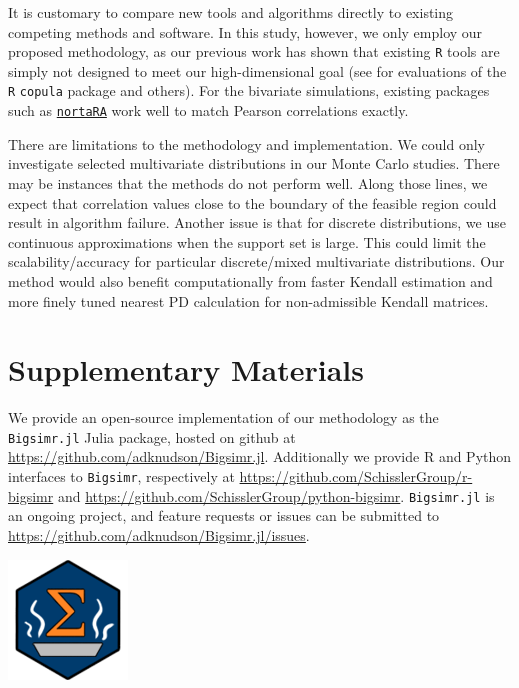 \documentclass[
]{jss}
\begin{document}
It is customary to compare new tools and algorithms directly to existing
competing methods and software. In this study, however, we only employ
our proposed methodology, as our previous work has shown that existing
\texttt{R} tools are simply not designed to meet our high-dimensional
goal (see \citet{Li2019gpu} for evaluations of the \texttt{R}
\texttt{copula} package and others). For the bivariate simulations,
existing packages such as
\href{https://github.com/superdesolator/NORTARA}{\texttt{nortaRA}} work
well to match Pearson correlations exactly.

There are limitations to the methodology and implementation. We could
only investigate selected multivariate distributions in our Monte Carlo
studies. There may be instances that the methods do not perform well.
Along those lines, we expect that correlation values close to the
boundary of the feasible region could result in algorithm failure.
Another issue is that for discrete distributions, we use continuous
approximations when the support set is large. This could limit the
scalability/accuracy for particular discrete/mixed multivariate
distributions. Our method would also benefit computationally from faster
Kendall estimation and more finely tuned nearest PD calculation for
non-admissible Kendall matrices.

\newpage

\hypertarget{misc}{%
\section*{Supplementary Materials}\label{misc}}

We provide an open-source implementation of our methodology as the
\texttt{Bigsimr.jl} Julia package, hosted on github at
\url{https://github.com/adknudson/Bigsimr.jl}. Additionally we provide R
and Python interfaces to \texttt{Bigsimr}, respectively at
\url{https://github.com/SchisslerGroup/r-bigsimr} and
\url{https://github.com/SchisslerGroup/python-bigsimr}.
\texttt{Bigsimr.jl} is an ongoing project, and feature requests or
issues can be submitted to
\url{https://github.com/adknudson/Bigsimr.jl/issues}.

\begin{CodeChunk}


\begin{center}\includegraphics[width=0.05\linewidth]{images/hex-bigsimr} \end{center}

\end{CodeChunk}
\end{document}
